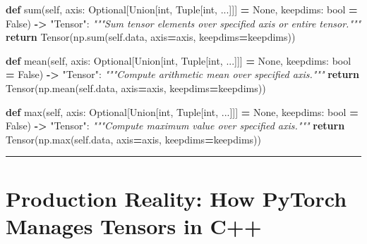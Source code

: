 \documentclass[
  letterpaper,
]{scrbook}
\newenvironment{Shaded}{\begin{snugshade}}{\end{snugshade}}
\newcommand{\BuiltInTok}[1]{#1}
\newcommand{\CommentTok}[1]{\textcolor[rgb]{0.56,0.35,0.01}{\textit{#1}}}
\newcommand{\ControlFlowTok}[1]{\textcolor[rgb]{0.13,0.29,0.53}{\textbf{#1}}}
\newcommand{\KeywordTok}[1]{\textcolor[rgb]{0.13,0.29,0.53}{\textbf{#1}}}
\newcommand{\NormalTok}[1]{#1}
\newcommand{\OperatorTok}[1]{\textcolor[rgb]{0.81,0.36,0.00}{\textbf{#1}}}
\newcommand{\StringTok}[1]{\textcolor[rgb]{0.31,0.60,0.02}{#1}}
\newcommand{\VariableTok}[1]{\textcolor[rgb]{0.00,0.00,0.00}{#1}}
\begin{document}
\begin{Shaded}
\begin{Highlighting}[]
\KeywordTok{def} \BuiltInTok{sum}\NormalTok{(}\VariableTok{self}\NormalTok{, axis: Optional[Union[}\BuiltInTok{int}\NormalTok{, Tuple[}\BuiltInTok{int}\NormalTok{, ...]]] }\OperatorTok{=} \VariableTok{None}\NormalTok{, keepdims: }\BuiltInTok{bool} \OperatorTok{=} \VariableTok{False}\NormalTok{) }\OperatorTok{{-}\textgreater{}} \StringTok{"Tensor"}\NormalTok{:}
    \CommentTok{"""Sum tensor elements over specified axis or entire tensor."""}
    \ControlFlowTok{return}\NormalTok{ Tensor(np.}\BuiltInTok{sum}\NormalTok{(}\VariableTok{self}\NormalTok{.data, axis}\OperatorTok{=}\NormalTok{axis, keepdims}\OperatorTok{=}\NormalTok{keepdims))}

\KeywordTok{def}\NormalTok{ mean(}\VariableTok{self}\NormalTok{, axis: Optional[Union[}\BuiltInTok{int}\NormalTok{, Tuple[}\BuiltInTok{int}\NormalTok{, ...]]] }\OperatorTok{=} \VariableTok{None}\NormalTok{, keepdims: }\BuiltInTok{bool} \OperatorTok{=} \VariableTok{False}\NormalTok{) }\OperatorTok{{-}\textgreater{}} \StringTok{"Tensor"}\NormalTok{:}
    \CommentTok{"""Compute arithmetic mean over specified axis."""}
    \ControlFlowTok{return}\NormalTok{ Tensor(np.mean(}\VariableTok{self}\NormalTok{.data, axis}\OperatorTok{=}\NormalTok{axis, keepdims}\OperatorTok{=}\NormalTok{keepdims))}

\KeywordTok{def} \BuiltInTok{max}\NormalTok{(}\VariableTok{self}\NormalTok{, axis: Optional[Union[}\BuiltInTok{int}\NormalTok{, Tuple[}\BuiltInTok{int}\NormalTok{, ...]]] }\OperatorTok{=} \VariableTok{None}\NormalTok{, keepdims: }\BuiltInTok{bool} \OperatorTok{=} \VariableTok{False}\NormalTok{) }\OperatorTok{{-}\textgreater{}} \StringTok{"Tensor"}\NormalTok{:}
    \CommentTok{"""Compute maximum value over specified axis."""}
    \ControlFlowTok{return}\NormalTok{ Tensor(np.}\BuiltInTok{max}\NormalTok{(}\VariableTok{self}\NormalTok{.data, axis}\OperatorTok{=}\NormalTok{axis, keepdims}\OperatorTok{=}\NormalTok{keepdims))}
\end{Highlighting}
\end{Shaded}

\begin{center}\rule{0.5\linewidth}{0.5pt}\end{center}

\section{Production Reality: How PyTorch Manages Tensors in
C++}\label{production-reality-how-pytorch-manages-tensors-in-c}
\end{document}
